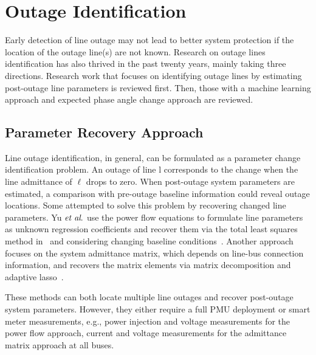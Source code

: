 
\section{Outage Identification} %
\label{sub:outage_identification}
Early detection of line outage may not lead to better system protection if the location of the outage line(s) are not known. Research on outage lines identification has also thrived in the past twenty years, mainly taking three directions. Research work that focuses on identifying outage lines by estimating post-outage line parameters is reviewed first. Then, those with a machine learning approach and expected phase angle change approach are reviewed.

\subsection{Parameter Recovery Approach}
Line outage identification, in general, can be formulated as a parameter change identification problem. An outage of line l corresponds to the change when the line admittance of $\ell$ drops to zero. When post-outage system parameters are estimated, a comparison with pre-outage baseline information could reveal outage locations. Some attempted to solve this problem by recovering changed line parameters. Yu $\textit{et al}.$ use the power flow equations to formulate line parameters as unknown regression coefficients and recover them via the total least squares method in~\cite{Yu2018} and considering changing baseline conditions~\cite{Yu2019}. Another approach focuses on the system admittance matrix, which depends on line-bus connection information, and recovers the matrix elements via matrix decomposition and adaptive lasso~\cite{Babakmehr2016,Ardakanian2019a}. 

These methods can both locate multiple line outages and recover post-outage system parameters. However, they either require a full PMU deployment or smart meter measurements, e.g., power injection and voltage measurements for the power flow approach, current and voltage measurements for the admittance matrix approach at all buses.


